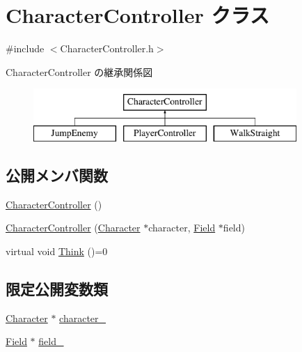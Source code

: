 \hypertarget{class_character_controller}{\section{Character\+Controller クラス}
\label{class_character_controller}
}


{\ttfamily \#include $<$Character\+Controller.\+h$>$}

Character\+Controller の継承関係図\begin{figure}[H]
\begin{center}
\leavevmode
\includegraphics[height=2.000000cm]{class_character_controller}
\end{center}
\end{figure}
\subsection*{公開メンバ関数}
\begin{DoxyCompactItemize}
\item 
\hyperlink{class_character_controller_a7f5914352c01a47e1a4ac75e3e277caa}{Character\+Controller} ()
\item 
\hyperlink{class_character_controller_a8c29d02e93455dd56828ae451769c53a}{Character\+Controller} (\hyperlink{class_character}{Character} $\ast$character, \hyperlink{class_field}{Field} $\ast$field)
\item 
virtual void \hyperlink{class_character_controller_a493d5b59610546133900f4de7110a487}{Think} ()=0
\end{DoxyCompactItemize}
\subsection*{限定公開変数類}
\begin{DoxyCompactItemize}
\item 
\hyperlink{class_character}{Character} $\ast$ \hyperlink{class_character_controller_a41167a323fafc09685765780911eab13}{character\+\_\+}
\item 
\hyperlink{class_field}{Field} $\ast$ \hyperlink{class_character_controller_aee517c96b5c50a91aa1b0f16b8defd01}{field\+\_\+}
\end{DoxyCompactItemize}



